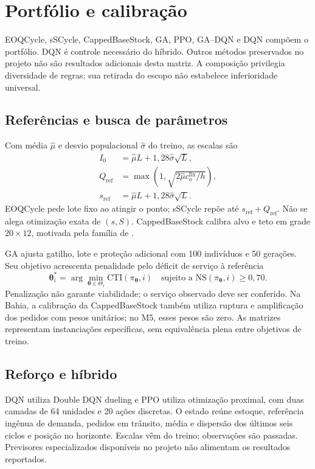 \section{Portfólio e calibração}
\label{sec:benchmark_massivo}\label{sec:portfolio_ampliado}
EOQCycle, sSCycle, CappedBaseStock, GA, PPO, GA--DQN e DQN compõem o portfólio. DQN é controle necessário do híbrido. Outros métodos preservados no projeto não são resultados adicionais desta matriz. A composição privilegia diversidade de regras; sua retirada do escopo não estabelece inferioridade universal.

\subsection{Referências e busca de parâmetros}
\label{sec:sinais_previsao}\label{sec:redundancia_portfolio}
Com média $\hat\mu$ e desvio populacional $\hat\sigma$ do treino, as escalas são
\begin{align}
 I_0&=\hat\mu L+1{,}28\hat\sigma\sqrt L,\label{eq:I0_metod}\\
 Q_{\mathrm{ref}}&=\max(1,\sqrt{2\hat\mu c_o^{\mathrm{fix}}/h}),\label{eq:qref_metod}\\
 s_{\mathrm{ref}}&=\hat\mu L+1{,}28\hat\sigma\sqrt L.\label{eq:sref_metod}
\end{align}
EOQCycle pede lote fixo ao atingir o ponto; sSCycle repõe até $s_{\mathrm{ref}}+Q_{\mathrm{ref}}$. Não se alega otimização exata de $(s,S)$. CappedBaseStock calibra alvo e teto em grade $20\times12$, motivada pela família de \citet{Xin2021CappedBaseStock}.

GA ajusta gatilho, lote e proteção adicional com 100 indivíduos e 50 gerações. Seu objetivo acrescenta penalidade pelo déficit de serviço à referência
\begin{equation}
 \boldsymbol\theta_i^*=\arg\min_{\boldsymbol\theta\in\Theta_i}\mathrm{CTI}(\pi_{\boldsymbol\theta},i)
 \quad\text{sujeito a }\mathrm{NS}(\pi_{\boldsymbol\theta},i)\geq0{,}70.
 \label{eq:obj_metaheuristicas}
\end{equation}
Penalização não garante viabilidade; o serviço observado deve ser conferido. Na Bahia, a calibração da CappedBaseStock também utiliza ruptura e amplificação dos pedidos com pesos unitários; no M5, esses pesos são zero. As matrizes representam instanciações específicas, sem equivalência plena entre objetivos de treino.

\subsection{Reforço e híbrido}
DQN utiliza Double DQN dueling e PPO utiliza otimização proximal, com duas camadas de 64 unidades e 20 ações discretas. O estado reúne estoque, referência ingênua de demanda, pedidos em trânsito, média e dispersão dos últimos seis ciclos e posição no horizonte. Escalas vêm do treino; observações são passadas. Previsores especializados disponíveis no projeto não alimentam os resultados reportados.

